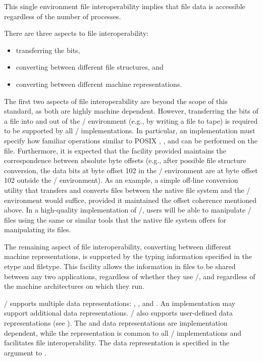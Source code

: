 This single environment file interoperability
implies that file data is accessible
regardless of the number of processes.

There are three aspects to file interoperability:
\begin{itemize}
\item transferring the bits,
\item converting between different file structures, and
\item converting between different machine representations.
\end{itemize}

The first two aspects of file interoperability are beyond the
scope of this standard, as both are highly machine dependent.
However, transferring the bits of a file
into and out of the \MPI/ environment (e.g., by writing a file to tape)
is required to be supported by all \MPI/ implementations.
In particular, an implementation must specify how familiar operations
similar to POSIX , , and  can
be performed on the file.
Furthermore, it is expected that the facility provided maintains
the correspondence between absolute byte offsets (e.g., after
possible file structure conversion, the data bits at byte offset 102
in the \MPI/ environment are at byte offset 102 outside
the \MPI/ environment).
As an example, a simple off-line conversion utility that transfers
and converts files between the native file system and the \MPI/ 
environment would suffice, provided it maintained the offset
coherence mentioned above.
In a high-quality implementation of \MPI/,
users will be able to manipulate \MPI/ files
using the same or similar tools that the native file system offers
for manipulating its files.

The remaining aspect of file interoperability,
converting between different machine representations,
is supported
by the typing information specified 
in the etype and filetype.
This facility allows the information in files to be
shared between any two applications,
regardless of whether they use \MPI/,
and regardless of the machine architectures on which they run.

\MPI/ supports multiple data representations:
, , and .
An implementation may support additional data representations.
\MPI/ also supports user-defined data representations
(see ).
The
 and 
data representations are implementation dependent,
while the
representation is
common to all \MPI/ implementations
and facilitates file interoperability.
The data representation is specified in the  argument
to .

